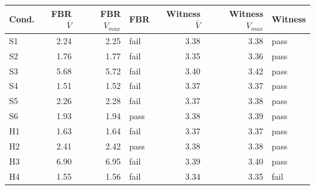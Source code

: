 \begin{tabular}{l rrl rrl}
\toprule
Cond. & FBR $\bar V$ & FBR $V_{max}$ & FBR & Witness $\bar V$ & Witness $V_{max}$ & Witness \\
\midrule
S1 & 2.24 & 2.25 & fail & 3.38 & 3.38 & pass \\
S2 & 1.76 & 1.77 & fail & 3.35 & 3.36 & pass \\
S3 & 5.68 & 5.72 & fail & 3.40 & 3.42 & pass \\
S4 & 1.51 & 1.52 & fail & 3.37 & 3.37 & pass \\
S5 & 2.26 & 2.28 & fail & 3.37 & 3.38 & pass \\
S6 & 1.93 & 1.94 & pass & 3.38 & 3.39 & pass \\
H1 & 1.63 & 1.64 & fail & 3.37 & 3.37 & pass \\
H2 & 2.41 & 2.42 & pass & 3.38 & 3.38 & pass \\
H3 & 6.90 & 6.95 & fail & 3.39 & 3.40 & pass \\
H4 & 1.55 & 1.56 & fail & 3.34 & 3.35 & fail \\
\bottomrule
\end{tabular}
